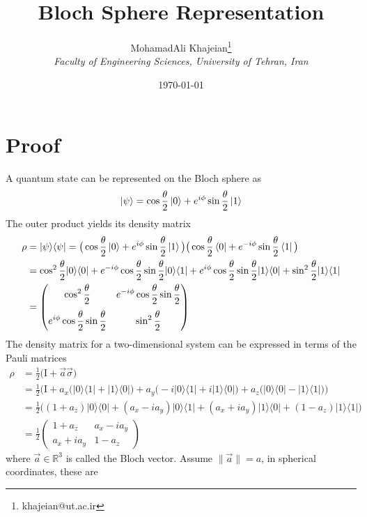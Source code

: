 \documentclass{article}
\title{\textbf{Bloch Sphere Representation}}
\author{
    MohamadAli Khajeian\footnote{khajeian@ut.ac.ir} \\ 
    \small \textit{Faculty of Engineering Sciences, University of Tehran, Iran} \\ 
}
\date{\today}
\newcommand{\op}[2]{|#1\rangle \langle#2|}
\begin{document}
\maketitle


\section*{Proof}
A quantum state can be represented on the Bloch sphere as
\begin{align*}
        \ket{\psi} = \cos\frac{\theta}{2}\ket{0} + e^{i\phi}\sin\frac{\theta}{2}\ket{1}
\end{align*}
The outer product yields its density matrix
\begin{align}
    \rho &= \op{\psi}{\psi} = \big(\cos\frac{\theta}{2}\ket{0} + e^{i\phi}\sin\frac{\theta}{2}\ket{1}\big)\big(\cos\frac{\theta}{2}\bra{0} + e^{-i\phi}\sin\frac{\theta}{2}\bra{1}\big) \nonumber\\
    &= \cos^2\frac{\theta}{2}\op{0}{0} + e^{-i\phi}\cos\frac{\theta}{2}\sin\frac{\theta}{2}\op{0}{1} + e^{i\phi}\cos\frac{\theta}{2}\sin\frac{\theta}{2}\op{1}{0} + \sin^2\frac{\theta}{2}\op{1}{1} \nonumber \\
    &= \begin{pmatrix}\displaystyle\cos^2\frac{\theta}{2}&\displaystyle e^{-i\phi}\cos\frac{\theta}{2}\sin\frac{\theta}{2}\\[1em]\displaystyle e^{i\phi}\cos\frac{\theta}{2}\sin\frac{\theta}{2}&\displaystyle \sin^2\frac{\theta}{2}\end{pmatrix} \label{m1}
\end{align}
The density matrix for a two-dimensional system can be expressed in terms of the Pauli matrices
\begin{align*}
    \rho &= \frac{1}{2}\big(\text{I} + \vec{a}\vec{\sigma}\big) \\
    &= \frac{1}{2}\bigg(\text{I} + a_{x}\big(\op{0}{1}+\op{1}{0}\big) + a_{y}\big(-i\op{0}{1}+i\op{1}{0}\big) + a_{z}\big(\op{0}{0}-\op{1}{1}\big)\bigg)\\
    &= \frac{1}{2}\bigg((1+a_{z})\op{0}{0}+(a_{x}-ia_{y})\op{0}{1}+(a_{x}+ia_{y})\op{1}{0}+(1-a_{z})\op{1}{1}\bigg) \\
    &= \frac{1}{2}\begin{pmatrix}\displaystyle 1+a_{z}&\displaystyle a_{x}-ia_{y}\\[1em]\displaystyle a_{x}+ia_{y}&\displaystyle 1-a_{z}\end{pmatrix}
\end{align*}
where ${\displaystyle {\vec {a}}\in \mathbb{R} ^{3}} $ is called the Bloch vector. Assume $\|\vec {a}\|=a$, in spherical coordinates, these are
\end{document}
